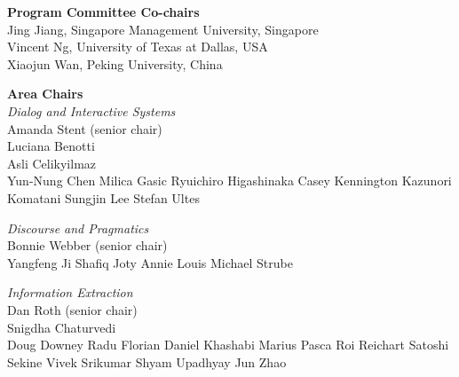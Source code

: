 {\bf Program Committee Co-chairs} \\
Jing Jiang, Singapore Management University, Singapore \\
Vincent Ng, University of Texas at Dallas, USA \\
Xiaojun Wan, Peking University, China

{\bf Area Chairs} \\
\emph{Dialog and Interactive Systems} \\
\hspace*{0.2in}Amanda Stent (senior chair) \\ 
\hspace*{0.2in}Luciana Benotti \\ 
\hspace*{0.2in}Asli Celikyilmaz \\
\hspace*{0.2in}Yun-Nung Chen
\hspace*{0.2in}Milica Gasic Ryuichiro Higashinaka
\hspace*{0.2in}Casey Kennington
\hspace*{0.2in}Kazunori Komatani
\hspace*{0.2in}Sungjin Lee
\hspace*{0.2in}Stefan Ultes


\emph{Discourse and Pragmatics} \\
\hspace*{0.2in}Bonnie Webber (senior chair) \\ 
\hspace*{0.2in}Yangfeng Ji
\hspace*{0.2in}Shafiq Joty
\hspace*{0.2in}Annie Louis
\hspace*{0.2in}Michael Strube


\emph{Information Extraction}\\
\hspace*{0.2in}Dan Roth (senior chair) \\
\hspace*{0.2in}Snigdha Chaturvedi \\
\hspace*{0.2in}Doug Downey
\hspace*{0.2in}Radu Florian
\hspace*{0.2in}Daniel Khashabi
\hspace*{0.2in}Marius Pasca
\hspace*{0.2in}Roi Reichart
\hspace*{0.2in}Satoshi Sekine
\hspace*{0.2in}Vivek Srikumar
\hspace*{0.2in}Shyam Upadhyay
\hspace*{0.2in}Jun Zhao


